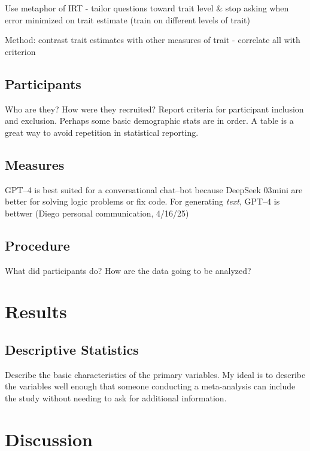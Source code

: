 \documentclass[
  jou,
  floatsintext,
  longtable,
  nolmodern,
  notxfonts,
  notimes,
  colorlinks=true,linkcolor=blue,citecolor=blue,urlcolor=blue]{apa7}
\begin{document}
Use metaphor of IRT - tailor questions toward trait level \& stop asking
when error minimized on trait estimate (train on different levels of
trait)

Method: contrast trait estimates with other measures of trait -
correlate all with criterion

\subsection{Participants}\label{participants}

Who are they? How were they recruited? Report criteria for participant
inclusion and exclusion. Perhaps some basic demographic stats are in
order. A table is a great way to avoid repetition in statistical
reporting.

\subsection{Measures}\label{measures}

GPT--4 is best suited for a conversational chat--bot because DeepSeek
03mini are better for solving logic problems or fix code. For generating
\emph{text}, GPT--4 is bettwer (Diego personal communication, 4/16/25)

\subsection{Procedure}\label{procedure}

What did participants do? How are the data going to be analyzed?

\section{Results}\label{results}

\subsection{Descriptive Statistics}\label{descriptive-statistics}

Describe the basic characteristics of the primary variables. My ideal is
to describe the variables well enough that someone conducting a
meta-analysis can include the study without needing to ask for
additional information.

\section{Discussion}\label{discussion}
\end{document}
